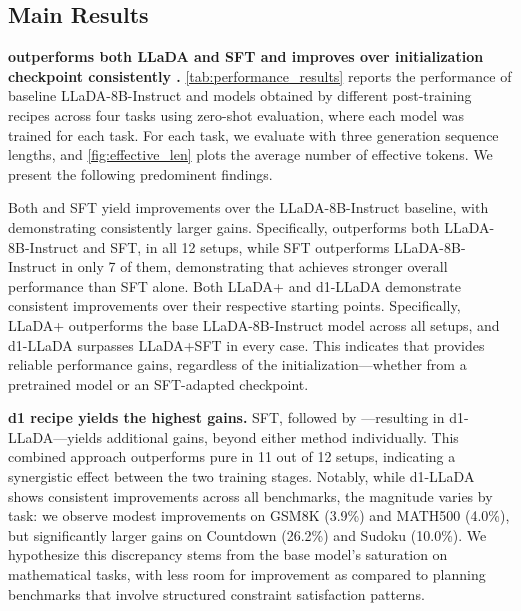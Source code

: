 \subsection{Main Results}
\label{subsec:training}

\textbf{\grpo{} outperforms both LLaDA and SFT and improves over initialization checkpoint consistently .}  
\cref{tab:performance_results} reports the performance of baseline LLaDA-8B-Instruct and models obtained by different post-training recipes across four tasks using zero-shot evaluation, where each \grpo{} model was trained for each task. For each task, we evaluate with three generation sequence lengths, and \cref{fig:effective_len} plots the average number of effective tokens. We present the following predominent findings.

Both \grpo{} and SFT yield improvements over the LLaDA-8B-Instruct baseline, with \grpo{} demonstrating consistently larger gains. Specifically, \grpo{} outperforms both LLaDA-8B-Instruct and SFT, in all 12 setups, while SFT outperforms LLaDA-8B-Instruct in only 7 of them, demonstrating that \grpo{} achieves stronger overall performance than SFT alone. Both LLaDA+\grpo{} and d1-LLaDA demonstrate consistent improvements over their respective starting points. Specifically, LLaDA+\grpo{} outperforms the base LLaDA-8B-Instruct model across all setups, and d1-LLaDA surpasses LLaDA+SFT in every case. This indicates that \grpo{} provides reliable performance gains, regardless of the initialization—whether from a pretrained model or an SFT-adapted checkpoint.

\textbf{d1 recipe yields the highest gains.}  
SFT, followed by \grpo{}—resulting in d1-LLaDA—yields additional gains, beyond either method individually. This combined approach outperforms pure \grpo{} in 11 out of 12 setups, indicating a synergistic effect between the two training stages. Notably, while d1-LLaDA shows consistent improvements across all benchmarks, the magnitude varies by task: we observe modest improvements on GSM8K (3.9\%) and MATH500 (4.0\%), but significantly larger gains on Countdown (26.2\%) and Sudoku (10.0\%). We hypothesize this discrepancy stems from the base model's saturation on mathematical tasks, with less room for improvement as compared to planning benchmarks that involve structured constraint satisfaction patterns.

